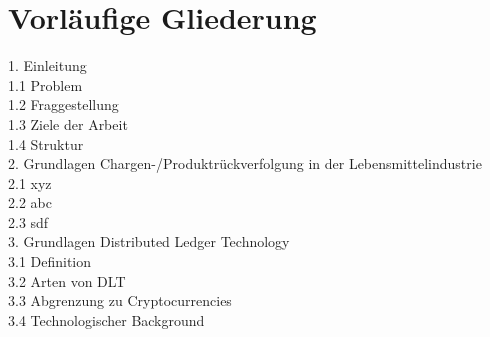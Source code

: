 \section{Vorläufige Gliederung}
\begin{small}
	1. Einleitung\\
	\noindent\hspace*{10mm}%
	1.1 Problem\\
	\noindent\hspace*{10mm}%
	1.2 Fraggestellung\\
	\noindent\hspace*{10mm}%
	1.3 Ziele der Arbeit\\
	\noindent\hspace*{10mm}%
	1.4 Struktur\\
	2. Grundlagen Chargen-/Produktrückverfolgung in der Lebensmittelindustrie\\
  \noindent\hspace*{10mm}%
  2.1 xyz\\
  \noindent\hspace*{10mm}%
  2.2 abc\\
  \noindent\hspace*{10mm}%
  2.3 sdf\\
  3. Grundlagen Distributed Ledger Technology\\
	\noindent\hspace*{10mm}%
  3.1 Definition\\
	\noindent\hspace*{10mm}%
	3.2 Arten von DLT\\
	\noindent\hspace*{10mm}%
	3.3 Abgrenzung zu Cryptocurrencies\\
	\noindent\hspace*{10mm}%
	3.4 Technologischer Background\\

\end{small}
